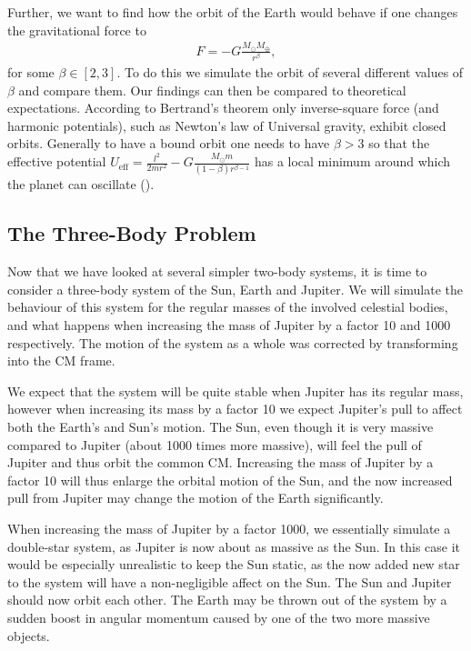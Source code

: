 \documentclass[twocolumn]{aastex62}
\begin{document}
Further, we want to find how the orbit of the Earth would behave if one changes the gravitational force to 
\begin{align}
    F = -G\frac{M_\odot M_\oplus}{r^\beta},
\end{align}
for some $\beta\in[2, 3]$. To do this we simulate the orbit of several different
values of $\beta$ and compare them. Our findings can then be compared to theoretical
expectations. According to Bertrand's theorem \citep[ch. 3.6]{goldstein:2001}
only inverse-square force (and harmonic potentials), such as Newton's law of Universal gravity,
exhibit closed orbits. Generally to have a bound orbit one needs to have $\beta >
3$ so
that the effective potential $U_\mathrm{eff} = \frac{l^2}{2mr^2} -
G\frac{M_\odot m}{(1-\beta)r^{\beta - 1}}$ has a local minimum around which the
planet can oscillate (\cite{ray:2004}).\\


\subsection{The Three-Body Problem} \label{subsec:three_body_prob}
Now that we have looked at several simpler two-body systems, it is time to
consider a three-body system of the Sun, Earth and Jupiter. We will simulate the
behaviour of this system for the regular masses of the involved celestial
bodies, and what happens when increasing the mass of Jupiter by a factor 10 and
1000 respectively. The motion of the system as a whole was corrected by
transforming into the CM frame.

We expect that the system will be quite stable when Jupiter has its regular
mass, however when increasing its mass by a factor 10 we expect Jupiter's pull to
affect both the Earth's and Sun's motion. The Sun, even though it is very massive
compared to Jupiter (about 1000 times more massive), will feel the pull of
Jupiter and thus orbit the common CM. Increasing the mass of
Jupiter by a factor 10 will thus enlarge the orbital motion of the Sun, and the
now increased pull from Jupiter may change the motion of the Earth significantly. 

When increasing the mass of Jupiter by a factor 1000, we essentially simulate a
double-star system, as Jupiter is now about as massive as the Sun. In this case
it would be especially unrealistic to keep the Sun static, as the now added new
star to the system will have a non-negligible affect on the Sun. The Sun and
Jupiter should now orbit each other. The Earth may be thrown out of the
system by a sudden boost in angular momentum caused by one of the two more massive
objects. 
\end{document}
